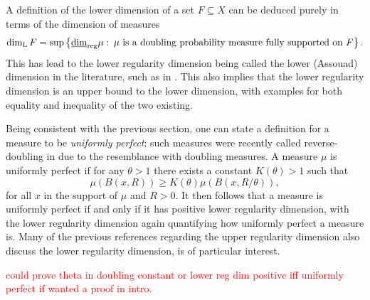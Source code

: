 A definition of the lower dimension of a set $F\subseteq X$ can be deduced purely in terms of the dimension of measures
\begin{equation}
    \dim_{\text{L}} F = \sup \left\{ \underline{\dim}_{\textup{reg}} \mu \,  \colon \, \mu \text{ is a doubling probability measure fully supported on } F\right\}.
\end{equation}
This has lead to the lower regularity dimension being called the lower (Assouad) dimension in the literature, such as in \cite{hare_troscheit}. This also implies that the lower regularity dimension is an upper bound to the lower dimension, with examples for both equality and inequality of the two existing.

Being consistent with the previous section, one can state a definition for a measure to be \textit{uniformly perfect}; such measures were recently called reverse-doubling in \cite{anti2} due to the resemblance with doubling measures. A measure $\mu$ is uniformly perfect if for any $\theta > 1$ there exists a constant $K(\theta) > 1$ such that 
\[
\mu(B(x,R)) \ge K(\theta) \mu(B(x,R/\theta)),
\]
for all $x$ in the support of $\mu$ and $R > 0$. It then follows that a measure is uniformly perfect if and only if it has positive lower regularity dimension, with the lower regularity dimension again quantifying how uniformly perfect a measure is. Many of the previous references regarding the upper regularity dimension also discuss the lower regularity dimension, \cite{hare-troscheit} is  of particular interest.


\textcolor{red}{could prove theta in doubling constant or lower reg dim positive iff uniformly perfect if wanted a proof in intro.}


